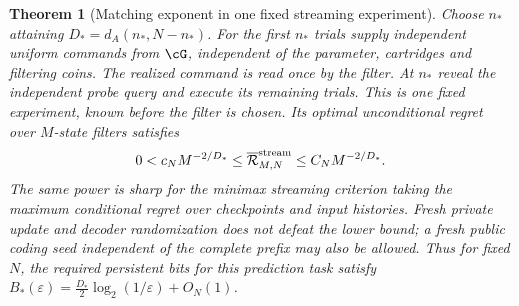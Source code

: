 \documentclass[11pt]{amsart}
\newtheorem{theorem}{Theorem}[section]
\theoremstyle{definition}\newtheorem{definition}[theorem]{Definition}
\theoremstyle{remark}\newtheorem{remark}[theorem]{Remark}
\begin{document}
\begin{theorem}[Matching exponent in one fixed streaming experiment]\label{thm:stream-lower}
Choose $n_*$ attaining $D_*=d_A(n_*,N-n_*)$. For the first $n_*$ trials
supply independent uniform commands from $\cG$, independent of the
parameter, cartridges and filtering coins. The realized command is read
once by the filter. At $n_*$ reveal the independent probe query and execute
its remaining trials. This is one fixed experiment, known before the
filter is chosen. Its optimal unconditional regret over $M$-state filters
satisfies
\begin{equation}\label{eq:stream-match}
 0<c_NM^{-2/D_*}\le\overline{\mathcal R}_{M,N}^{\rm stream}
                  \le C_NM^{-2/D_*}.
\end{equation}
The same power is sharp for the minimax streaming criterion taking the
maximum conditional regret over checkpoints and input histories. Fresh
private update and decoder randomization does not defeat the lower bound;
a fresh public coding seed independent of the complete prefix may also be
allowed. Thus for fixed $N$, the required persistent bits for this prediction
task satisfy
$B_*(\varepsilon)=\tfrac{D_*}{2}\log_2(1/\varepsilon)+O_N(1)$.
\end{theorem}
\end{document}
